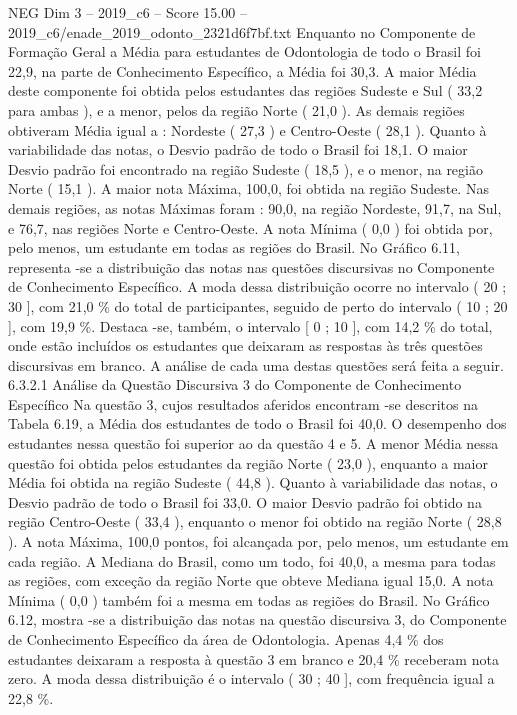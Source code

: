 \begin{textsample}{NEG Dim 3 – 2019\_c6 – Score 15.00 – 2019\_c6/enade\_2019\_odonto\_2321d6f7bf.txt}
Enquanto no Componente de Formação Geral a Média para estudantes de Odontologia de todo o Brasil foi 22,9, na parte de Conhecimento Específico, a Média foi 30,3.
A maior Média deste componente foi obtida pelos estudantes das regiões Sudeste e Sul ( 33,2 para ambas ), e a menor, pelos da região Norte ( 21,0 ).
As demais regiões obtiveram Média igual a : Nordeste ( 27,3 ) e Centro-Oeste ( 28,1 ).
Quanto à variabilidade das notas, o Desvio padrão de todo o Brasil foi 18,1.
O maior Desvio padrão foi encontrado na região Sudeste ( 18,5 ), e o menor, na região Norte ( 15,1 ).
A maior nota Máxima, 100,0, foi obtida na região Sudeste.
Nas demais regiões, as notas Máximas foram : 90,0, na região Nordeste, 91,7, na Sul, e 76,7, nas regiões Norte e Centro-Oeste.
A nota Mínima ( 0,0 ) foi obtida por, pelo menos, um estudante em todas as regiões do Brasil.
No Gráfico 6.11, representa -se a distribuição das notas nas questões discursivas no Componente de Conhecimento Específico.
A moda dessa distribuição ocorre no intervalo ( 20 ; 30 ], com 21,0 \% do total de participantes, seguido de perto do intervalo ( 10 ; 20 ], com 19,9 \%.
Destaca -se, também, o intervalo [ 0 ; 10 ], com 14,2 \% do total, onde estão incluídos os estudantes que deixaram as respostas às três questões discursivas em branco.
A análise de cada uma destas questões será feita a seguir. 6.3.2.1 Análise da Questão Discursiva 3 do Componente de Conhecimento Específico Na questão 3, cujos resultados aferidos encontram -se descritos na Tabela 6.19, a Média dos estudantes de todo o Brasil foi 40,0.
O desempenho dos estudantes nessa questão foi superior ao da questão 4 e 5.
A menor Média nessa questão foi obtida pelos estudantes da região Norte ( 23,0 ), enquanto a maior Média foi obtida na região Sudeste ( 44,8 ).
Quanto à variabilidade das notas, o Desvio padrão de todo o Brasil foi 33,0.
O maior Desvio padrão foi obtido na região Centro-Oeste ( 33,4 ), enquanto o menor foi obtido na região Norte ( 28,8 ).
A nota Máxima, 100,0 pontos, foi alcançada por, pelo menos, um estudante em cada região.
A Mediana do Brasil, como um todo, foi 40,0, a mesma para todas as regiões, com exceção da região Norte que obteve Mediana igual 15,0.
A nota Mínima ( 0,0 ) também foi a mesma em todas as regiões do Brasil.
No Gráfico 6.12, mostra -se a distribuição das notas na questão discursiva 3, do Componente de Conhecimento Específico da área de Odontologia.
Apenas 4,4 \% dos estudantes deixaram a resposta à questão 3 em branco e 20,4 \% receberam nota zero.
A moda dessa distribuição é o intervalo ( 30 ; 40 ], com frequência igual a 22,8 \%.

\end{textsample}
